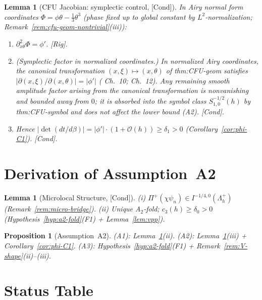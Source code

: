 \documentclass[12pt,a4paper]{amsart}
\newtheorem{lemma}[theorem]{Lemma}
\newtheorem{proposition}[theorem]{Proposition}
\theoremstyle{definition}
\theoremstyle{remark}
\newcommand{\Rig}{\textup{[Rig]}}
\newcommand{\Cond}{\textup{[Cond]}}
\begin{document}
\begin{lemma}[CFU Jacobian: symplectic control, \Cond]
\label{lem:cfu-jacobian-1d}
In Airy normal form coordinates $\Phi=\phi\theta-\tfrac13\theta^3$
(phase fixed up to global constant by $L^2$-normalization;
Remark~\ref{rem:cfu-geom-nontrivial}(iii)):
\begin{enumerate}[{\rm(i)}]
\item $\partial^2_{x\theta}\Phi=\phi'$. \Rig.
\item \textit{(Symplectic factor in normalized coordinates.)}
  In normalized Airy coordinates, the canonical transformation
  $(x,\xi)\mapsto(x,\theta)$ of thm:CFU-geom satisfies
  $|\partial(x,\xi)/\partial(x,\theta)|=|\phi'|$
  (\cite{Olver1974} Ch.~10; \cite{Zworski2012} Ch.~12).
  Any remaining smooth amplitude factor arising from the
  canonical transformation is nonvanishing and bounded away from $0$;
  it is absorbed into the symbol class $S^{-1/2}_{1,0}(h)$
  by thm:CFU-symbol and does not affect the lower bound (A2). \Cond.
\item Hence $|\det(dt/d\beta)|=|\phi'|\cdot(1+\mathcal{O}(h))\ge\delta_1>0$
  (Corollary~\ref{cor:phi-C1}). \Cond.
\end{enumerate}
\end{lemma}

\section{Derivation of Assumption~A2}
\label{sec:a2-derivation}

\begin{lemma}[Microlocal Structure, \Cond]
\label{lem:olver-fio-lift-micro}
(i) $\Pi^+(\chi\psi_n)\in I^{-1/4,0}(\Lambda_h^+)$
(Remark~\ref{rem:micro-bridge}).
(ii) Unique A$_2$-fold; $c_3(h)\ge\delta_0>0$
(Hypothesis~\ref{hyp:a2-fold}(F1) + Lemma~\ref{lem:vpp}).
\end{lemma}

\begin{proposition}[Assumption~A2]
\label{prop:a2-from-lemmas}
(A1): Lemma~\ref{lem:olver-fio-lift-micro}(ii).
(A2): Lemma~\ref{lem:cfu-jacobian-1d}(iii) + Corollary~\ref{cor:phi-C1}.
(A3): Hypothesis~\ref{hyp:a2-fold}(F1) + Remark~\ref{rem:V-shape}(ii)--(iii).
\end{proposition}

\section{Status Table}
\label{sec:status}
\end{document}
